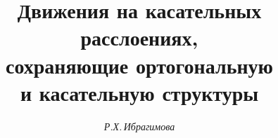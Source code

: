 









\newcommand{\dstyle}{\displaystyle}


\newcommand{\down}[2]{\underset{#1}{#2}{}}


\newcommand{\up}[2]{\overset{#1}{#2}{}}








\newcommand{\tts}[1]{}










\setcounter{page}{29}












\author{\it Р.Х.\,Ибрагимова}




\title{Движения на касательных расслоениях,\\


сохраняющие ортогональную \\ и касательную структуры}





\date{}







